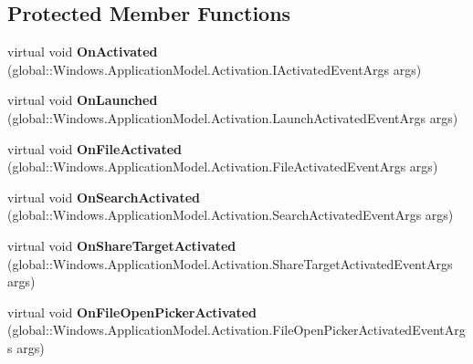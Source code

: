 \subsection*{Protected Member Functions}
\begin{DoxyCompactItemize}
\item 
\mbox{\label{class_windows_1_1_u_i_1_1_xaml_1_1_application_a1007269442b51bcb8b6f72fb5c538c4d}} 
virtual void {\bfseries On\+Activated} (global\+::\+Windows.\+Application\+Model.\+Activation.\+I\+Activated\+Event\+Args args)
\item 
\mbox{\label{class_windows_1_1_u_i_1_1_xaml_1_1_application_ac34abc539f620025d7e6026118ec1fb9}} 
virtual void {\bfseries On\+Launched} (global\+::\+Windows.\+Application\+Model.\+Activation.\+Launch\+Activated\+Event\+Args args)
\item 
\mbox{\label{class_windows_1_1_u_i_1_1_xaml_1_1_application_ad3a115248881604e559640ff7d3f1510}} 
virtual void {\bfseries On\+File\+Activated} (global\+::\+Windows.\+Application\+Model.\+Activation.\+File\+Activated\+Event\+Args args)
\item 
\mbox{\label{class_windows_1_1_u_i_1_1_xaml_1_1_application_a361d968000b09b19ff4e794b6550ff86}} 
virtual void {\bfseries On\+Search\+Activated} (global\+::\+Windows.\+Application\+Model.\+Activation.\+Search\+Activated\+Event\+Args args)
\item 
\mbox{\label{class_windows_1_1_u_i_1_1_xaml_1_1_application_a9281a10e995bfc3ce84c4732cd139856}} 
virtual void {\bfseries On\+Share\+Target\+Activated} (global\+::\+Windows.\+Application\+Model.\+Activation.\+Share\+Target\+Activated\+Event\+Args args)
\item 
\mbox{\label{class_windows_1_1_u_i_1_1_xaml_1_1_application_a6349d39f9b31d3d870acad8ce929f8cb}} 
virtual void {\bfseries On\+File\+Open\+Picker\+Activated} (global\+::\+Windows.\+Application\+Model.\+Activation.\+File\+Open\+Picker\+Activated\+Event\+Args args)
\item 

\end{DoxyCompactItemize}
